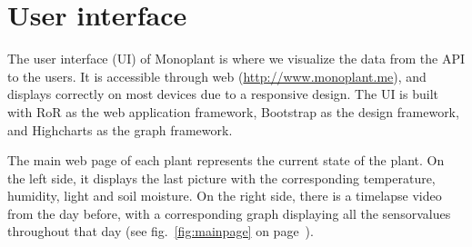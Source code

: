 









\section{User interface}
The user interface (UI) of Monoplant is where we visualize the data from the API to the users. It is accessible through web (\url{http://www.monoplant.me}), and displays correctly on most devices due to a responsive design. The UI is built with RoR as the web application framework, Bootstrap as the design framework, and Highcharts as the graph framework.   

The main web page of each plant represents the current state of the plant. On the left side, it displays the last picture with the corresponding temperature, humidity, light and soil moisture. On the right side, there is a timelapse video from the day before, with a corresponding graph displaying all the sensorvalues throughout that day (see fig.~\ref{fig:mainpage} on page~\pageref{fig:mainpage}). 

